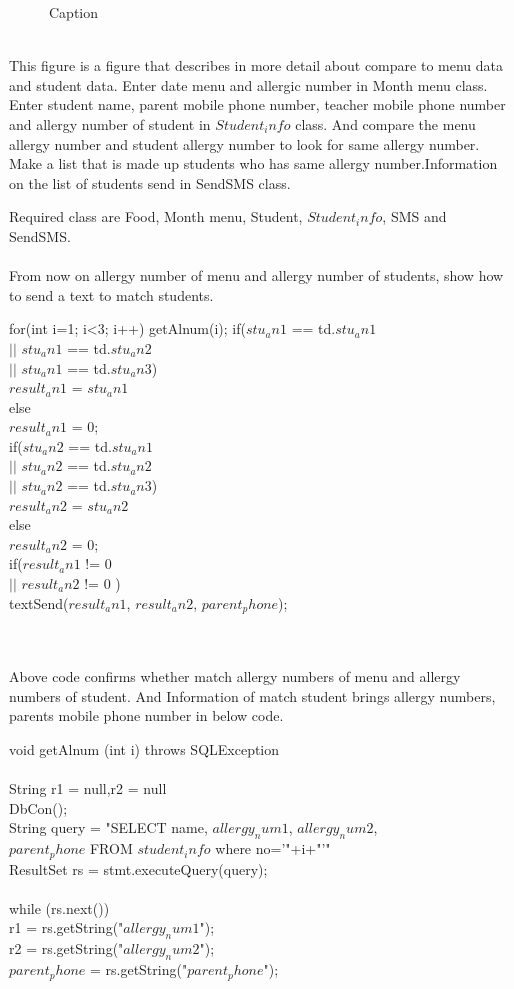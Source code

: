 \documentclass[a4paper,11pt]{IEEEtran}
\begin{document}
{{{{\begin{figure}[!h]
        \caption{Caption}
        \label{fig1}
\end{figure}
~\\
This figure is a figure that describes in more detail about compare to menu data and student data. Enter date menu and allergic number in Month menu class. Enter student name, parent mobile phone number, teacher mobile phone number and allergy number of student in $Student_info$ class. And compare the menu allergy number and student allergy number to look for same allergy number. Make a list that is made up students who has same allergy number.Information on the list of students send in SendSMS class.

Required class are Food, Month menu, Student, $Student_info$, SMS and SendSMS.\\
~\\
From now on allergy number of menu and allergy number of students, show how to send a text to match students.

for(int i=1; i<3; i++)
{
getAlnum(i);
if($stu_an1$ == td.$stu_an1$\\ 
$||$ $stu_an1$ == td.$stu_an2$\\
$||$ $stu_an1$ == td.$stu_an3$)\\
$result_an1$ = $stu_an1$\\
else\\
$result_an1$ = 0;\\
if($stu_an2$ == td.$stu_an1$\\ 
$||$ $stu_an2$ == td.$stu_an2$ \\
$||$ $stu_an2$ == td.$stu_an3$)\\
$result_an2$ = $stu_an2$\\
else\\
$result_an2$ = 0;\\
if($result_an1$ != 0 \\
$||$ $result_an2$ != 0 )\\
textSend($result_an1$, $result_an2$, $parent_phone$);\\
}\\
}
~\\
Above code confirms whether match allergy numbers of menu and allergy numbers of student. And Information of match student brings allergy numbers, parents mobile phone number in below code.

void getAlnum (int i) throws SQLException\\
{\\
String r1 = null,r2 = null\\
DbCon();\\
String query = "SELECT name, $allergy_num1$, $allergy_num2$,\\ $parent_phone$ FROM $student_info$ where no='"+i+"'"\\
ResultSet rs = stmt.executeQuery(query);\\
\\
while (rs.next()) {\\
r1 = rs.getString("$allergy_num1$");\\
r2 = rs.getString("$allergy_num2$");\\
$parent_phone$ = rs.getString("$parent_phone$");\\
}\\

}}}}
\end{document}
